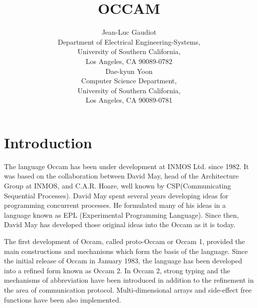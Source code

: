 %
%
\setlength{\topmargin}{-0.5in}
\setlength{\oddsidemargin}{0.0in}
\setlength{\textheight}{9.0in}
\setlength{\textwidth}{6.5in}
\setlength{\parindent}{2em}


\title{OCCAM}
\author{Jean-Luc Gaudiot \\ 
	Department of Electrical Engineering-Systems, \\
	University of Southern California, \\
	Los Angeles, CA 90089-0782 \vspace{0.2in} \\
	Dae-kyun Yoon \\
	Computer Science Department, \\
	University of Southern California, \\
	Los Angeles, CA 90089-0781}
\date{}


\setlength{\baselineskip}{3ex}
\setlength{\parskip}{0.7\baselineskip}
\maketitle

\section{Introduction}


\par
The language Occam has been under development at INMOS Ltd. since
1982.  It was based on the collaboration between David May, head of
the Architecture Group at INMOS, and C.A.R. Hoare, well known by 
CSP(Communicating Sequential Processes). \cite{Hoa78,InmosOcc88}
David May spent several years developing ideas for programming
concurrent processes.  He formulated many of his ideas in a language
known as EPL (Experimental Programming Language).  Since then, David
May has developed those original ideas into the Occam as it is
today. 

The first development of Occam, called proto-Occam or Occam 1,
provided the main constructions and mechanisms which form the basis of
the language.
Since the initial release of Occam in January 1983, the language has
been developed into a refined form known as Occam 2.  In Occam 2,
strong typing and the mechanisms of abbreviation have been introduced in
addition to the refinement in the area of communication protocol.
Multi-dimensional arrays and side-effect free functions have been also
implemented. \cite{InmosOcc88,JonesG88,PounM87}

